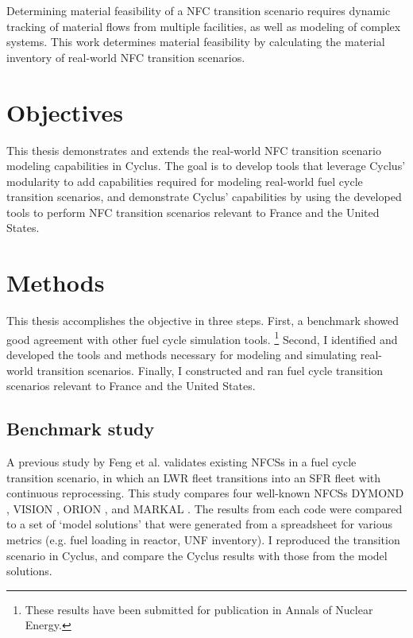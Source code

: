 Determining material feasibility of a \gls{NFC} transition scenario
requires dynamic tracking of material flows from multiple facilities,
as well as modeling of complex systems. This work
determines material feasibility by calculating
the material inventory of real-world \gls{NFC} transition scenarios.


\section{Objectives}

This thesis demonstrates and extends the real-world \gls{NFC} transition
scenario modeling capabilities in Cyclus. 
The goal is to
develop tools that leverage Cyclus' modularity to
add capabilities required for modeling real-world
fuel cycle transition scenarios, and demonstrate Cyclus'
capabilities by using the developed tools to perform
\gls{NFC} transition scenarios relevant to France and the United
States.

\section{Methods}
This thesis accomplishes the objective in three steps. 
First, a benchmark showed good agreement with other
fuel cycle simulation tools. \footnote{These results have been
submitted for publication in Annals of Nuclear Energy.}
Second, I identified and developed the tools and methods necessary
for modeling and simulating real-world transition scenarios.
Finally, I constructed and ran fuel cycle transition scenarios
relevant to France and the United States.

\subsection{Benchmark study}
A previous study by Feng et al. \cite{feng_standardized_2016} validates existing 
\glspl{NFCS} in a fuel cycle transition scenario, in which an \gls{LWR} fleet
transitions into an \gls{SFR} fleet with continuous reprocessing. This 
study compares four well-known \glspl{NFCS}
DYMOND \cite{yacout_modeling_2005},
VISION \cite{jacobson_verifiable_2010},
ORION \cite{gregg_analysis_2012}, and
MARKAL \cite{shay_epa_2006}. The results from each code were
compared to a set of `model solutions' that were generated
from a spreadsheet for various metrics (e.g. fuel loading
in reactor, \gls{UNF} inventory). I reproduced the transition
scenario in Cyclus, and compare the Cyclus results with those
from the model solutions.

